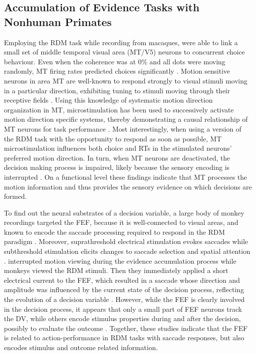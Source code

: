 \subsection{Accumulation of Evidence Tasks with Nonhuman Primates}
Employing the RDM task while recording from macaques, \textcite{Britten1992} were able to link a small set of middle temporal visual area (MT/V5) neurons to concurrent choice behaviour. Even when the coherence was at 0\% and all dots were moving randomly, MT firing rates predicted choices significantly \parencite{Britten1996}. Motion sensitive neurons in area MT are well-known to respond strongly to visual stimuli moving in a particular direction, exhibiting tuning to stimuli moving through their receptive fields \parencite{Baker1981,VanEssen1981,Zeki1980,Zeki1974}. Using this knowledge of systematic motion direction organization in MT, microstimulation has been used to successively activate motion direction specific systems, thereby demonstrating a causal relationship of MT neurons for task performance \parencite{Ditterich2003,Salzman1990,Salzman1992}. Most interestingly, when using a version of the RDM task with the opportunity to respond as soon as possible, MT microstimulation influences both choice and RTs in the stimulated neurons’ preferred motion direction. In turn, when MT neurons are deactivated, the decision making process is impaired, likely because the sensory encoding is interrupted \parencite{Katz2016}. On a functional level these findings indicate that MT processes the motion information and thus provides the sensory evidence on which decisions are formed.

To find out the neural substrates of a decision variable, a large body of monkey recordings targeted the FEF, because it is well-connected to visual areas, and known to encode the saccade processing required to respond in the RDM paradigm \parencite{Felleman1991,Hanes1996,Schall1995,Schall1995a,Thompson1996,VanEssen1992}. Moreover, suprathreshold electrical stimulation evokes saccades while subthreshold stimulation elicits changes to saccade selection and spatial attention \parencite{Burman1997,Moore2001,Moore2003,Robinson1969}. \textcite{Gold2000} interrupted motion viewing during the evidence accumulation process while monkeys viewed the RDM stimuli. Then they immediately applied a short electrical current to the FEF, which resulted in a saccade whose direction and amplitude was influenced by the current state of the decision process, reflecting the evolution of a decision variable \parencite{Gold2000,Gold2003}. However, while the FEF is clearly involved in the decision process, it appears that only a small part of FEF neurons track the DV, while others encode stimulus properties during and after the decision, possibly to evaluate the outcome \parencite{Ding2012}. Together, these studies indicate that the FEF is related to action-performance in RDM tasks with saccade responses, but also encodes stimulus and outcome related information.

